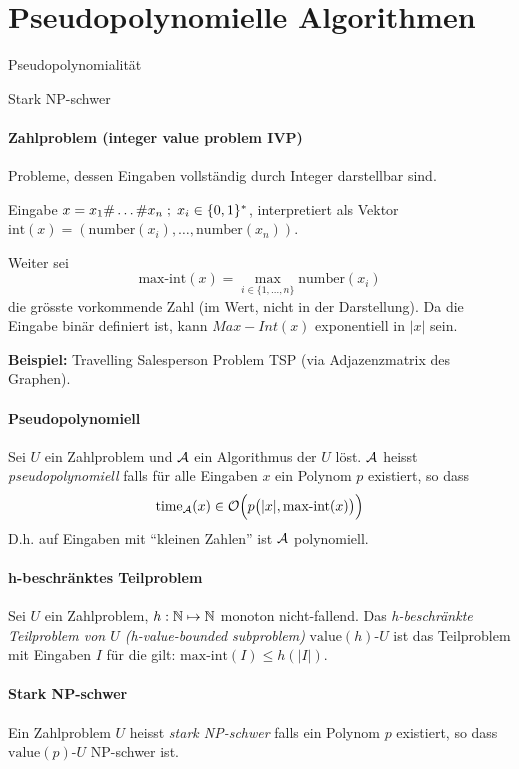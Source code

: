 \section{Pseudopolynomielle Algorithmen}

\begin{takeaway}
    \item Pseudopolynomialität
    \item Stark NP-schwer
\end{takeaway}

\paragraph{Zahlproblem (integer value problem IVP)} Probleme, dessen Eingaben vollständig durch Integer darstellbar sind.

Eingabe $x = x_1 \# \dots \# x_n \; ; \; x_i \in \lbrace 0, 1 \rbrace^*$, interpretiert als Vektor $\text{int}(x) = (\text{number}(x_i), \dots, \text{number}(x_n))$.

Weiter sei 
\[\text{max-int}(x) = \max_{i \in \{1, ..., n\}} \text{number}(x_i)\]
die grösste vorkommende Zahl (im Wert, nicht in der Darstellung). Da die Eingabe binär definiert ist, kann $Max-Int(x)$ exponentiell in $|x|$ sein.

\textbf{Beispiel:} Travelling Salesperson Problem TSP (via Adjazenzmatrix des Graphen).

\paragraph{Pseudopolynomiell}
Sei $U$ ein Zahlproblem und $\mathcal{A}$ ein Algorithmus der $U$ löst.
$\mathcal{A}$ heisst \emph{pseudopolynomiell} falls für alle Eingaben $x$ ein Polynom $p$ existiert, so dass
$$ \text{time}_{\mathcal{A}} (x) \in \mathcal{O} \Big( p \big( |x| , \text{max-int}(x) \big) \Big) $$
D.h. auf Eingaben mit ``kleinen Zahlen'' ist $\mathcal{A}$ polynomiell.

\paragraph{h-beschränktes Teilproblem}
Sei $U$ ein Zahlproblem, $h: \mathbb{N} \mapsto \mathbb{N}$ monoton nicht-fallend.
Das \emph{h-beschränkte Teilproblem von $U$ (h-value-bounded subproblem)} $\text{value}(h)\text{-}U$
ist das Teilproblem mit Eingaben $I$ für die gilt: $\text{max-int}(I) \leq h(|I|)$.

\paragraph{Stark NP-schwer}
Ein Zahlproblem $U$ heisst \emph{stark NP-schwer} falls ein Polynom $p$ existiert, so dass $\text{value}(p)\text{-}U$ NP-schwer ist.

